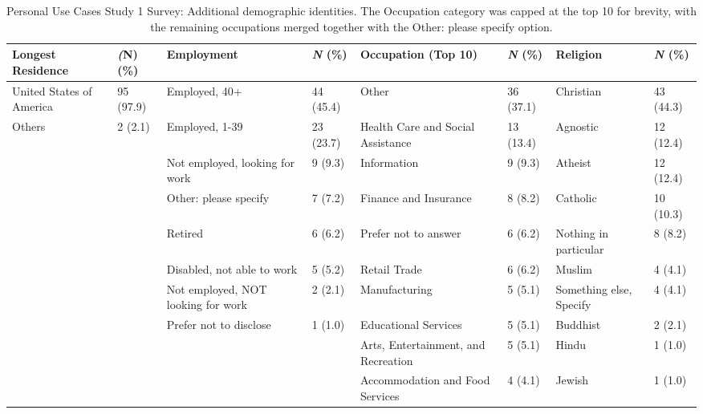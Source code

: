 \begin{table*}[htpb]
    \centering
    \footnotesize
    \begin{tabularx}{\textwidth}{Xl|Xl|Xl|Xl}
    \toprule
        \textbf{Longest Residence} & \textbf{\textit(N) (\%)} & \textbf{Employment} & \textbf{\textit{N} (\%)} & \textbf{Occupation (Top 10)} & \textbf{\textit{N} (\%)} & \textbf{Religion} & \textbf{\textit{N} (\%)} \\
    \midrule
United States of America & 95 (97.9) & Employed, 40+ & 44 (45.4) & Other & 36 (37.1) & Christian & 43 (44.3)\\
Others & 2 (2.1) & Employed, 1-39 & 23 (23.7) & Health Care and Social Assistance & 13 (13.4) & Agnostic & 12 (12.4)\\
 &  & Not employed, looking for work & 9 (9.3) & Information & 9 (9.3) & Atheist & 12 (12.4)\\
 &  & Other: please specify & 7 (7.2) & Finance and Insurance & 8 (8.2) & Catholic & 10 (10.3)\\
 &  & Retired & 6 (6.2) & Prefer not to answer & 6 (6.2) & Nothing in particular & 8 (8.2)\\
 &  & Disabled, not able to work & 5 (5.2) & Retail Trade & 6 (6.2) & Muslim & 4 (4.1)\\
 &  & Not employed, NOT looking for work & 2 (2.1) & Manufacturing & 5 (5.1) & Something else, Specify & 4 (4.1)\\
 &  & Prefer not to disclose & 1 (1.0) & Educational Services & 5 (5.1) & Buddhist & 2 (2.1)\\
 &  &  &  & Arts, Entertainment, and Recreation & 5 (5.1) & Hindu & 1 (1.0)\\
 &  &  &  & Accommodation and Food Services & 4 (4.1) & Jewish & 1 (1.0)\\
 \bottomrule
    \end{tabularx}
    \caption{Personal Use Cases Study 1 Survey: Additional demographic identities. The Occupation category was capped at the top 10 for brevity, with the remaining occupations merged together with the Other: please specify option.}
    \label{app:demographics-3-personal-p2}
\end{table*}